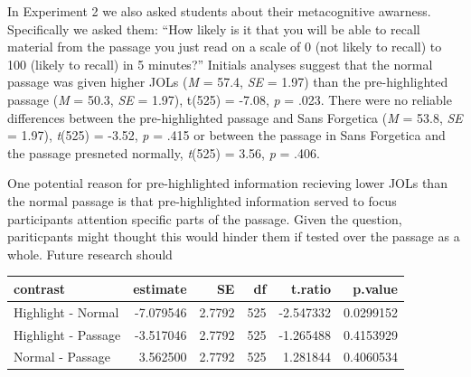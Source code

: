 \documentclass[doc]{apa6}
\begin{document}
In Experiment 2 we also asked students about their metacognitive awarness. Specifically we asked them: \enquote{How likely is it that you will be able to recall material from the passage you just read on a scale of 0 (not likely to recall) to 100 (likely to recall) in 5 minutes?} Initials analyses suggest that the normal passage was given higher JOLs (\emph{M} = 57.4, \emph{SE} = 1.97) than the pre-highlighted passage (\emph{M} = 50.3, \emph{SE} = 1.97), t(525) = -7.08, \emph{p} = .023. There were no reliable differences between the pre-highlighted passage and Sans Forgetica (\emph{M} = 53.8, \emph{SE} = 1.97), \emph{t}(525) = -3.52, \emph{p} = .415 or between the passage in Sans Forgetica and the passage presneted normally, \emph{t}(525) = 3.56, \emph{p} = .406.

One potential reason for pre-highlighted information recieving lower JOLs than the normal passage is that pre-highlighted information served to focus participants attention specific parts of the passage. Given the question, pariticpants might thought this would hinder them if tested over the passage as a whole. Future research should

\begin{tabular}{l|r|r|r|r|r}
\hline
contrast & estimate & SE & df & t.ratio & p.value\\
\hline
Highlight - Normal & -7.079546 & 2.7792 & 525 & -2.547332 & 0.0299152\\
\hline
Highlight - Passage & -3.517046 & 2.7792 & 525 & -1.265488 & 0.4153929\\
\hline
Normal - Passage & 3.562500 & 2.7792 & 525 & 1.281844 & 0.4060534\\
\hline
\end{tabular}
\end{document}
